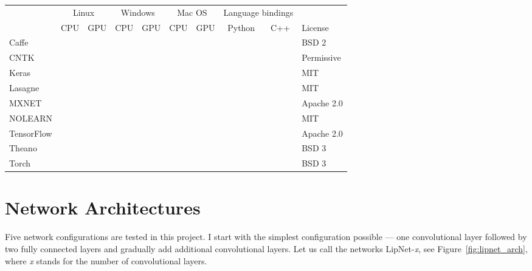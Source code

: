 \documentclass[a4paper, 11pt, table]{article}
\newcommand{\cmark}{\ding{51}}%
\newcommand{\xmark}{\ding{55}}%
\newcommand{\ymark}{\textcolor{clyes}{\cmark}}%
\newcommand{\nmark}{\textcolor{clno}{\xmark}}%
\begin{document}
\begin{landscape}
\begin{center}
\label{tbl:comparison_of_dl_lib}
\begin{tabular}{lccccccccl}
\hline 
 & \multicolumn{2}{c}{\cellcolor{linux}Linux} & \multicolumn{2}{c}{\cellcolor{windows}Windows} & \multicolumn{2}{c}{\cellcolor{macos}Mac OS} & \multicolumn{2}{c}{Language bindings} &  \\ 
 & \cellcolor{linux}CPU & \cellcolor{linux}GPU & \cellcolor{windows}CPU & \cellcolor{windows}GPU & \cellcolor{macos}CPU & \cellcolor{macos}GPU & Python & C++ & License\\ 
\hline 
Caffe & \ymark & \ymark & \ymark & \ymark & \ymark & \ymark & \ymark & \nmark & BSD 2\\ 
CNTK & \ymark & \ymark & \ymark & \ymark & \nmark & \nmark & \ymark & \ymark & Permissive \\ 
Keras & \ymark & \ymark & \ymark & \ymark & \ymark & \ymark & \ymark & \nmark & MIT \\ 
Lasagne & \ymark & \ymark & \ymark & \ymark & \ymark & \ymark & \ymark & \nmark & MIT \\ 
MXNET & \ymark & \ymark & \ymark & \ymark & \ymark & \ymark & \ymark & \ymark & Apache 2.0 \\ 
NOLEARN & \ymark & \ymark & \ymark & \ymark & \ymark & \ymark & \ymark & \nmark & MIT \\ 
TensorFlow & \ymark & \ymark & \nmark & \nmark & \ymark & \nmark & \ymark & \ymark & Apache 2.0 \\ 
Theano & \ymark & \ymark & \ymark & \ymark & \ymark & \ymark & \ymark & \nmark & BSD 3\\ 
Torch & \ymark & \ymark & \ymark & \ymark & \ymark & \ymark & \nmark & \ymark & BSD 3\\ 
\end{tabular} 
\end{center}


\end{landscape}

\section{Network Architectures}

Five network configurations are tested in this project. I start with the simplest configuration possible --- one convolutional layer followed by two fully connected layers and gradually add additional convolutional layers. Let us call the networks LipNet-\textit{x}, see Figure~\ref{fig:lipnet_arch}, where \textit{x} stands for the number of convolutional layers. 
\end{document}
